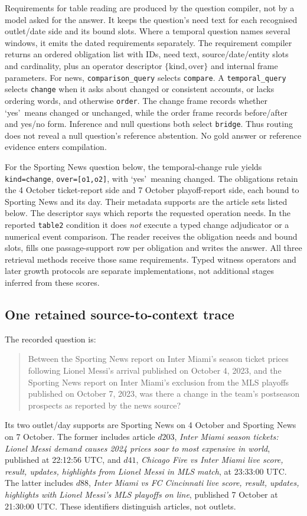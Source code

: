 Requirements for table reading are produced by the question compiler, not by a model asked for the answer.
It keeps the question's need text for each recognised outlet/date side and its bound slots.
Where a temporal question names several windows, it emits the dated requirements separately.
The requirement compiler returns an ordered obligation list with IDs, need text, source/date/entity slots and cardinality, plus an operator descriptor \(\{\mathrm{kind},\mathrm{over}\}\) and internal frame parameters.
For news, \texttt{comparison\_query} selects \texttt{compare}.
A \texttt{temporal\_query} selects \texttt{change} when it asks about changed or consistent accounts, or lacks ordering words, and otherwise \texttt{order}.
The change frame records whether \lq yes\rq\ means changed or unchanged, while the order frame records before/after and yes/no form.
Inference and null questions both select \texttt{bridge}.
Thus routing does not reveal a null question's reference abstention.
No gold answer or reference evidence enters compilation.

For the Sporting News question below, the temporal-change rule yields \texttt{kind=change}, \texttt{over=[o1,o2]}, with \lq yes\rq\ meaning changed.
The obligations retain the 4 October ticket-report side and 7 October playoff-report side, each bound to Sporting News and its day.
Their metadata supports are the article sets listed below.
The descriptor says which reports the requested operation needs.
In the reported \texttt{table2} condition it does \emph{not} execute a typed change adjudicator or a numerical event comparison.
The reader receives the obligation needs and bound slots, fills one passage-support row per obligation and writes the answer.
All three retrieval methods receive those same requirements.
Typed witness operators and later growth protocols are separate implementations, not additional stages inferred from these scores.

\subsection{One retained source-to-context trace}
The recorded question is:
\begin{quote}\small
Between the Sporting News report on Inter Miami's season ticket prices following Lionel Messi's arrival published on October 4, 2023, and the Sporting News report on Inter Miami's exclusion from the MLS playoffs published on October 7, 2023, was there a change in the team's postseason prospects as reported by the news source?
\end{quote}
Its two outlet/day supports are Sporting News on 4 October and Sporting News on 7 October.
The former includes article \(d203\), \emph{Inter Miami season tickets: Lionel Messi demand causes 2024 prices soar to most expensive in world}, published at 22:12:56 UTC, and \(d41\), \emph{Chicago Fire vs Inter Miami live score, result, updates, highlights from Lionel Messi in MLS match}, at 23:33:00 UTC.
The latter includes \(d88\), \emph{Inter Miami vs FC Cincinnati live score, result, updates, highlights with Lionel Messi's MLS playoffs on line}, published 7 October at 21:30:00 UTC.
These identifiers distinguish articles, not outlets.

